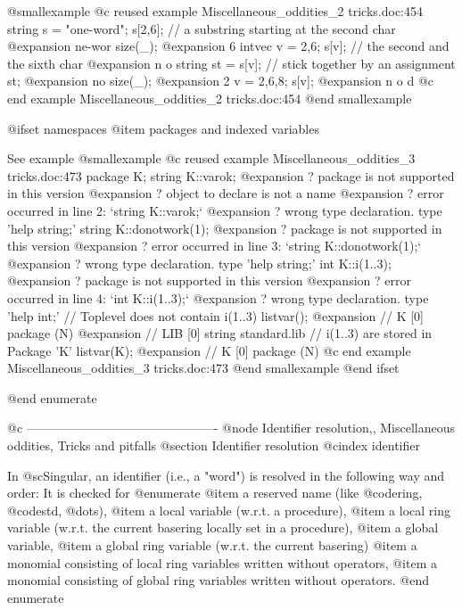@smallexample
@c reused example Miscellaneous_oddities_2 tricks.doc:454 
  string s = "one-word";
  s[2,6];     // a substring starting at the second char
@expansion{} ne-wor
  size(_);
@expansion{} 6
  intvec v = 2,6;
  s[v];      // the second and the sixth char
@expansion{} n o
  string st = s[v];  // stick together by an assignment
  st;
@expansion{} no
  size(_);
@expansion{} 2
  v = 2,6,8;
  s[v];
@expansion{} n o d
@c end example Miscellaneous_oddities_2 tricks.doc:454
@end smallexample

@ifset namespaces
@item packages and indexed variables

See example
@smallexample
@c reused example Miscellaneous_oddities_3 tricks.doc:473 
package K;
string K::varok;
@expansion{}    ? package is not supported in this version
@expansion{}    ? object to declare is not a name
@expansion{}    ? error occurred in line 2: `string K::varok;`
@expansion{}    ? wrong type declaration. type 'help string;'
string K::donotwork(1);
@expansion{}    ? package is not supported in this version
@expansion{}    ? error occurred in line 3: `string K::donotwork(1);`
@expansion{}    ? wrong type declaration. type 'help string;'
int K::i(1..3);
@expansion{}    ? package is not supported in this version
@expansion{}    ? error occurred in line 4: `int K::i(1..3);`
@expansion{}    ? wrong type declaration. type 'help int;'
// Toplevel does not contain i(1..3)
listvar();
@expansion{} // K                    [0]  package (N)
@expansion{} // LIB                  [0]  string standard.lib
// i(1..3) are stored in Package 'K'
listvar(K);
@expansion{} // K                    [0]  package (N)
@c end example Miscellaneous_oddities_3 tricks.doc:473
@end smallexample
@end ifset

@end enumerate

@c ----------------------------------------------
@node Identifier resolution,, Miscellaneous oddities, Tricks and pitfalls
@section Identifier resolution
@cindex identifier

In @sc{Singular}, an identifier (i.e., a "word") is resolved in the
following way and order: It is checked for
@enumerate
@item
a reserved name (like @code{ring}, @code{std}, @dots{}),
@item
a local  variable (w.r.t. a procedure),
@item
a local ring variable (w.r.t. the current basering locally set in a procedure),
@item
a global variable,
@item
a global ring variable (w.r.t. the current basering)
@item
a monomial consisting of local ring variables written without operators,
@item
a monomial consisting of global ring variables written without operators.
@end enumerate

